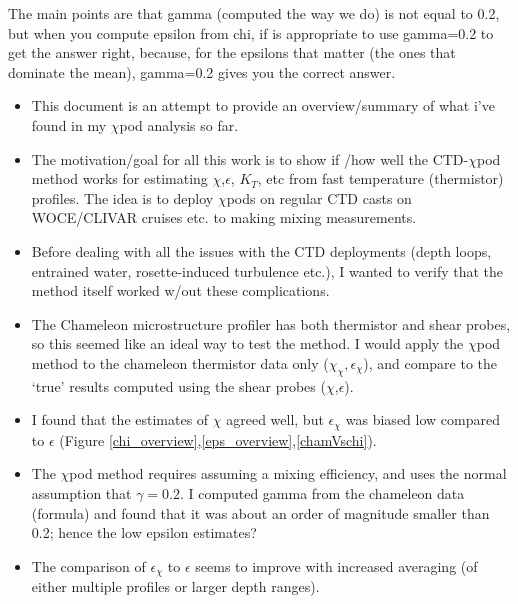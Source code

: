 \documentclass[11pt]{article}
\begin{document}
The main points are that gamma (computed the way we do) is not equal to 0.2, but when you compute epsilon from chi, if is appropriate to use gamma=0.2 to get the answer right, because, for the epsilons that matter (the ones that dominate the mean), gamma=0.2 gives you the correct answer.

\begin{itemize}

\item This document is an attempt to provide an overview/summary of what i've found in my $\chi$pod analysis so far. 

\item The motivation/goal for all this work is to show if /how well the CTD-$\chi$pod method works for estimating $\chi$,$\epsilon$, $K_T$, etc from fast temperature (thermistor) profiles. The idea is to deploy $\chi$pods on regular CTD casts on WOCE/CLIVAR cruises etc. to making mixing measurements.

\item Before dealing with all the issues with the CTD deployments (depth loops, entrained water, rosette-induced turbulence etc.), I wanted to verify that the method itself worked w/out these complications. 

\item The Chameleon microstructure profiler has both thermistor and shear probes, so this seemed like an ideal way to test the method. I would apply the $\chi$pod method to the chameleon thermistor data only ($\chi_{\chi},\epsilon_{\chi}$), and compare to the `true' results computed using the shear probes ($\chi$,$\epsilon$).

\item I found that the estimates of $\chi$ agreed well, but $\epsilon_{\chi}$ was biased low compared to $\epsilon$ (Figure \ref{chi_overview},\ref{eps_overview},\ref{chamVschi}).

\item The $\chi$pod method requires assuming a mixing efficiency, and uses the normal assumption that $\gamma=0.2$. I computed gamma from the chameleon data (formula) and found that it was about an order of magnitude smaller than 0.2; hence the low epsilon estimates?
\item The comparison of $\epsilon_{\chi}$ to $\epsilon$ seems to improve with increased averaging (of either multiple profiles or larger depth ranges). 

\end{itemize}
\end{document}
